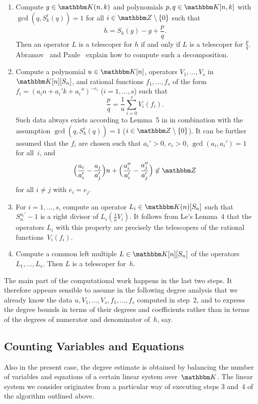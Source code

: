\documentclass{sig-alternate}
\let\set\mathbbm
\def\K{\set K}
\begin{document}
\begin{enumerate}
\item Compute $g\in\K(n,k)$ and polynomials $p,q\in\K[n,k]$ with $\gcd(q,S_k^i(q))=1$ for all $i\in\set Z\setminus\{0\}$
  such that
  \[
    h = S_k(g) - g + \frac pq.
  \]
  Then an operator $L$ is a telescoper for $h$ if and only if $L$ is a telescoper for $\frac pq$.
  Abramov~\cite{abramov95a} and Paule~\cite{paule95} explain how to compute such a decomposition.
\item Compute a polynomial $u\in\K[n]$, operators $V_1,\dots,V_s$ in $\K[n][S_n]$, and
  rational functions $f_1,\dots,f_s$ of the form $f_i=(a_in+a_i'k+a_i'')^{-e_i}$ ($i=1,\dots,s$) such that
  \[
    \frac pq = \frac1u\sum_{i=0}^s V_i(f_i).
  \]
  Such data always exists according to Lemma~5 in \cite{le03} in combination with the assumption $\gcd(q,S_k^i(q))=1$
  ($i\in\set Z\setminus\{0\}$). It can be further assumed that the $f_i$ are chosen such that $a_i'>0$, $e_i>0$,
  $\gcd(a_i,a_i')=1$ for all~$i$, and
  \[
    \Bigl(\frac{a_i}{a_i'} - \frac{a_j}{a_j'}\Bigr)n +
    \Bigl(\frac{a_i''}{a_i'} - \frac{a_j''}{a_j'}\Bigr) \not\in\set Z
  \]
  for all $i\neq j$ with $e_i=e_j$.
\item For $i=1,\dots,s$, compute an operator $L_i\in\K(n)[S_n]$ such that $S_n^{a_i'}-1$ is a right divisor
  of $L_i (\frac1uV_i)$. It follows from Le's Lemma~4 that the operators $L_i$ with this property are precisely
  the telescopers of the rational functions~$V_i(f_i)$.
\item Compute a common left multiple $L\in\K[n][S_n]$ of the operators $L_1,\dots,L_s$.
  Then $L$ is a telescoper for~$h$.
\end{enumerate}

The main part of the computational work happens in the last two steps. It
therefore appears sensible to assume in the following degree analysis that we
already know the data $u, V_1,\dots,V_s, f_1,\dots,f_s$ computed in step~2, and
to express the degree bounds in terms of their degrees and coefficients rather
than in terms of the degrees of numerator and denominator of~$h$, say.

\subsection{Counting Variables and Equations}

Also in the present case, the degree estimate is obtained by balancing the number of variables and
equations of a certain linear system over~$\K$. The linear system we consider originates from a
particular way of executing steps 3 and~4 of the algorithm outlined above.
\end{document}
